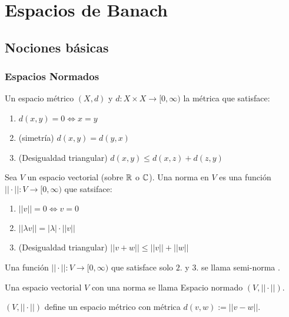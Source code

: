 \chapter{Espacios de Banach}

\section{Nociones básicas}

\subsection{Espacios Normados}

\begin{fdefinition}
    Un espacio métrico $(X,d)$ y $d:X\times X\to [0,\infty)$ la métrica que satisface:

    \begin{enumerate}
        \item $d(x,y)=0\iff x=y$
        \item (simetría) $d(x,y)=d(y,x)$
        \item (Desigualdad triangular) $d(x,y)\leq d(x,z)+d(z,y)$
    \end{enumerate}
\end{fdefinition}

\begin{fdefinition}[]
    Sea $V$ un espacio vectorial (sobre $\mathbb{R}$ o $\mathbb{C}$). Una norma en $V$ es una función $||\cdot||:V\to [0,\infty)$ que satsiface:

    \begin{enumerate}
        \item $||v||=0\iff v=0$
        \item $||\lambda v||=|\lambda|\cdot ||v||$
        \item (Desigualdad triangular) $||v+w||\leq ||v||+||w||$
    \end{enumerate}
\end{fdefinition}

Una función $||\cdot||:V\to[0,\infty)$ que satisface solo $2.$ y $3.$ se llama \color{red} semi-norma \color{black}.

Una espacio vectorial $V$ con una norma se llama \color{red} Espacio normado \color{black} $(V,||\cdot||)$.

\begin{fproposition}
    $(V,||\cdot||)$ define un espacio métrico con métrica $d(v,w):=||v-w||$.
\end{fproposition}

